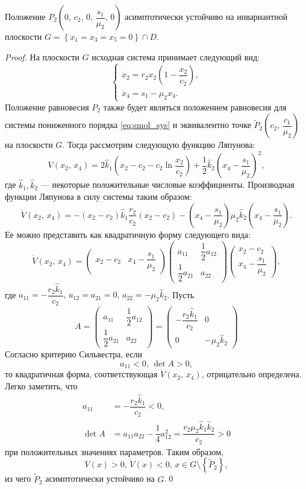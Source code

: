 \documentclass[14pt,a4paper]{extarticle}
\begin{document}
	\begin{theorem}
		Положение $P_2\left(0,\, c_2,\,0,\,\dfrac{s_1}{\mu_2},\, 0\right)$ асимптотически устойчиво на инвариантной плоскости $G=\left\{x_1=x_3=x_5=0\right\}\cap D$. 
	\end{theorem}
	\begin{proof}
		На плоскости $G$ исходная система принимает следующий вид:
		\begin{equation}\label{eq:smol_sys}
			\begin{cases}
				\dot{x}_2=r_2x_2\left(1-\dfrac{x_2}{c_2}\right),\\
				\dot{x}_4=s_1-\mu_2x_4.
			\end{cases}
		\end{equation}
		Положение равновесия $P_2$ также будет являться положением равновесия для системы пониженного порядка \ref{eq:smol_sys} и эквивалентно точке $\tilde{P}_2\left(c_2,\, \dfrac{c_1}{\mu_2}\right)$ на плоскости $G$. Тогда рассмотрим следующую функцию Ляпунова:
		\[V(x_2,\, x_4)=2\hat{k}_1\left(x_2-c_2-c_2\ln\dfrac{x_2}{c_2}\right)+\dfrac{1}{2}\hat{k}_2\left(x_4-\dfrac{s_1}{\mu_2}\right)^2,\]
		где $\hat{k}_1,\hat{k}_2$ --- некоторые положительные числовые коэффициенты. Производная функции Ляпунова в силу системы таким образом:
		\[\dot{V}(x_2,\,x_4)=-(x_2-c_2)\hat{k}_1\dfrac{r_2}{c_2}(x_2-c_2)-\left(x_4-\dfrac{s_1}{\mu_2}\right)\mu_2\hat{k}_2\left(x_4-\dfrac{s_1}{\mu_2}\right).\]
		Ее можно представить как квадратичную форму следующего вида:
		\[\dot{V}(x_2,\, x_4)=\begin{pmatrix}
			x_2-c_2 & x_4-\dfrac{s_1}{\mu_2}
		\end{pmatrix}\begin{pmatrix}
			a_{11} & \dfrac{1}{2}a_{12}\\
			\dfrac{1}{2}a_{21} & a_{22}
		\end{pmatrix}\begin{pmatrix}
			x_2-c_2\\
			x_4-\dfrac{s_1}{\mu_2}
		\end{pmatrix},\]
		где $a_{11}=-\dfrac{r_2\hat{k}_1}{c_2},\, a_{12}=a_{21}=0,\, a_{22}=-\mu_2\hat{k}_2$. Пусть
		\[A=\begin{pmatrix}
			a_{11} & \dfrac{1}{2}a_{12}\\
			\dfrac{1}{2}a_{21} & a_{22}
		\end{pmatrix}=\begin{pmatrix}
			-\dfrac{r_2\hat{k}_1}{c_2} & 0\\
			0 & -\mu_2\hat{k}_2
		\end{pmatrix}\]
		Согласно критерию Сильвестра, если 
		\[a_{11}<0,\, \det A>0,\]
		то квадратичная форма, соответствующая $\dot{V}(x_2,\, x_4)$, отрицательно определена. Легко заметить, что 
		\begin{align*}
			a_{11} &= -\dfrac{r_2\hat{k}_1}{c_2}<0,\\
			\det A &= a_{11}a_{22}-\dfrac{1}{4}a^2_{12} = \dfrac{r_2\mu_2\hat{k}_1\hat{k}_2}{c_2}>0
		\end{align*}
		при положительных значениях параметров. Таким образом, 
		\[V(x)>0,\, \dot{V}(x)<0,\, x\in G\setminus\left\{\tilde{P}_2\right\},\]
		из чего $\tilde{P}_2$ асимптотически устойчиво на $G$.\qed
	\end{proof}
	
\end{document}
